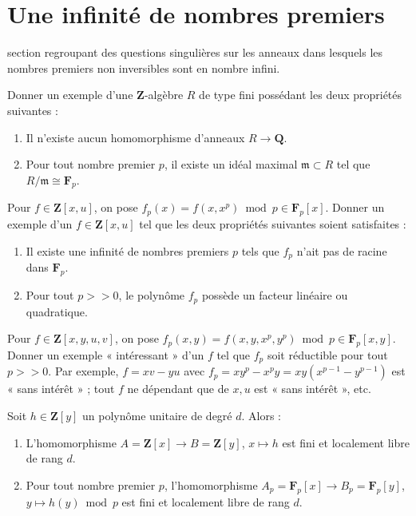 \section{Une infinité de nombres premiers}
\label{section-many-primes}

\noindent
section regroupant des questions singulières sur les anneaux dans lesquels
les nombres premiers non inversibles sont en nombre infini.

\begin{exercise}
\label{exercise-not-in-Q}
Donner un exemple d'une ${\mathbf Z}$-algèbre $R$ de type fini
possédant les deux propriétés suivantes :
\begin{enumerate}
\item Il n'existe aucun homomorphisme d'anneaux $R \to {\mathbf Q}$.
\item Pour tout nombre premier $p$, il existe un idéal maximal
${\mathfrak m} \subset R$ tel que $R/{\mathfrak m} \cong {\mathbf F}_p$.
\end{enumerate}
\end{exercise}

\begin{exercise}
\label{exercise-strange-fp-1}
Pour $f \in {\mathbf Z}[x, u]$, on pose $f_p(x)
= f(x, x^p) \bmod p \in {\mathbf F}_p[x]$. Donner un exemple
d'un $f \in {\mathbf Z}[x, u]$ tel que les deux propriétés
suivantes soient satisfaites :
\begin{enumerate}
\item Il existe une infinité de nombres premiers $p$ tels que $f_p$
n'ait pas de racine dans ${\mathbf F}_p$.
\item Pour tout $p >> 0$, le polynôme $f_p$ possède un facteur
linéaire ou quadratique.
\end{enumerate}
\end{exercise}

\begin{exercise}
\label{exercise-strange-fp-2}
Pour $f \in {\mathbf Z}[x, y, u, v]$, on pose $f_p(x, y)
= f(x, y, x^p, y^p) \bmod p \in {\mathbf F}_p[x, y]$. Donner un exemple
« intéressant » d'un $f$ tel que $f_p$ soit réductible pour tout $p >> 0$.
Par exemple, $f = xv-yu$ avec $f_p = xy^p-x^py = xy(x^{p-1}-y^{p-1})$ est
« sans intérêt » ; tout $f$ ne dépendant que de $x, u$ est « sans intérêt »,
etc.
\end{exercise}

\begin{remark}
\label{remark-strange-fp}
Soit $h \in {\mathbf Z}[y]$ un polynôme unitaire de degré $d$.
Alors :
\begin{enumerate}
\item L'homomorphisme $A = {\mathbf Z}[x] \to B ={\mathbf Z}[y]$,
$x \mapsto h$ est fini et localement libre de rang $d$.
\item Pour tout nombre premier $p$, l'homomorphisme
$A_p = {\mathbf F}_p[x]\to B_p = {\mathbf F}_p[y]$,
$y \mapsto h(y) \bmod p$ est fini et localement libre de rang $d$.
\end{enumerate}
\end{remark}


